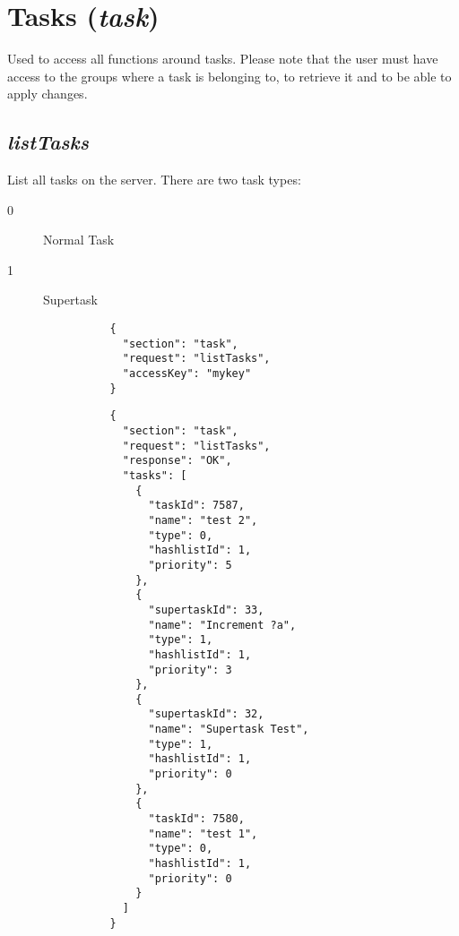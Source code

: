 	\section*{Tasks (\textit{task})}
		Used to access all functions around tasks. Please note that the user must have access to the groups where a task is belonging to, to retrieve it and to be able to apply changes.
		\subsection*{\textit{listTasks}}
			List all tasks on the server. There are two task types:
			\begin{description}
				\item[0] Normal Task
				\item[1] Supertask
			\end{description}
			{
				\color{blue}
				\begin{verbatim}
				{
				  "section": "task",
				  "request": "listTasks",
				  "accessKey": "mykey"
				}
				\end{verbatim}
			}
			{
				\color{OliveGreen}
				\begin{verbatim}
				{
				  "section": "task",
				  "request": "listTasks",
				  "response": "OK",
				  "tasks": [
				    {
				      "taskId": 7587,
				      "name": "test 2",
				      "type": 0,
				      "hashlistId": 1,
				      "priority": 5
				    },
				    {
				      "supertaskId": 33,
				      "name": "Increment ?a",
				      "type": 1,
				      "hashlistId": 1,
				      "priority": 3
				    },
				    {
				      "supertaskId": 32,
				      "name": "Supertask Test",
				      "type": 1,
				      "hashlistId": 1,
				      "priority": 0
				    },
				    {
				      "taskId": 7580,
				      "name": "test 1",
				      "type": 0,
				      "hashlistId": 1,
				      "priority": 0
				    }
				  ]
				}
				\end{verbatim}
			}
